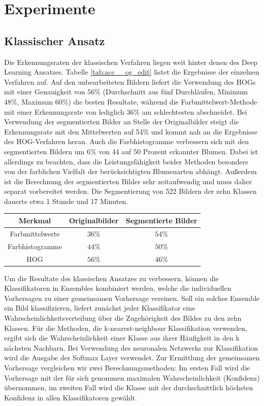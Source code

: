 \documentclass[11pt,a4paper]{article}
\begin{document}
\section{Experimente}


\subsection{Klassischer Ansatz}
Die Erkennungsraten der klassischen Verfahren liegen weit hinter denen des Deep Learning Ansatzes. Tabelle \ref{tab:acc__og_edit} listet die Ergebnisse der einzelnen Verfahren auf. Auf den unbearbeiteten Bildern liefert die Verwendung des HOGs mit einer Genauigkeit von 56\% (Durchschnitt aus fünf Durchläufen, Minimum 48\%, Maximum 60\%) die besten Resultate, während die Farbmittelwert-Methode mit einer Erkennungsrate von lediglich 36\% am schlechtesten abschneidet. Bei Verwendung der segmentierten Bilder an Stelle der Originalbilder steigt die Erkennungsrate mit den Mittelwerten auf 54\% und kommt nah an die Ergebnisse des HOG-Verfahren heran. Auch die Farbhistogramme verbessern sich mit den segmentierten Bildern um 6\% von 44 auf 50 Prozent erkannter Blumen. Dabei ist allerdings zu beachten, dass die Leistungsfähigkeit beider Methoden besonders von der farblichen Vielfalt der berücksichtigten Blumenarten abhängt. Außerdem ist die Berechnung der segmentierten Bilder sehr zeitaufwendig und muss daher separat vorbereitet werden. Die Segmentierung von 522 Bildern der zehn Klassen dauerte etwa 1 Stunde und 17 Minuten.

\begin{center}
	\begin{tabular}{c || c | c}
		Merkmal & Originalbilder & Segmentierte Bilder \\ \hline \hline
		Farbmittelwerte & $36\%$ & $54\%$ \\ \hline
		Farbhistogramme & $44\%$ & $50\%$ \\ \hline
		HOG & $56\%$ & $46\%$
	\end{tabular}
	\label{tab:acc__og_edit}
\end{center}

Um die Resultate des klassischen Ansatzes zu verbessern, können die Klassifikatoren in Ensembles kombiniert werden, welche die individuellen Vorhersagen zu einer gemeinsamen Vorhersage vereinen. Soll ein solches Ensemble ein Bild klassifizieren, liefert zunächst jeder Klassifikator eine Wahrscheinlichkeitsverteilung über die Zugehörigkeit des Bildes zu den zehn Klassen. Für die Methoden, die k-nearest-neighbour Klassifikation verwenden, ergibt sich die Wahrscheinlichkeit einer Klasse aus ihrer Häufigkeit in den k nächsten Nachbarn. Bei Verwendung des neuronalen Netzwerks zur Klassifikation wird die Ausgabe der Softmax Layer verwendet. Zur Ermitt\-lung der gemeinsamen Vorhersage vergleichen wir zwei Berechnungsmethoden: Im ersten Fall wird die Vorhersage mit der für sich genommen maxi\-malen Wahrscheinlichkeit (Konfidenz) übernommen, im zweiten Fall wird die Klasse mit der durchschnittlich höchsten Konfidenz in allen Klassifikatoren gewählt.
\end{document}
